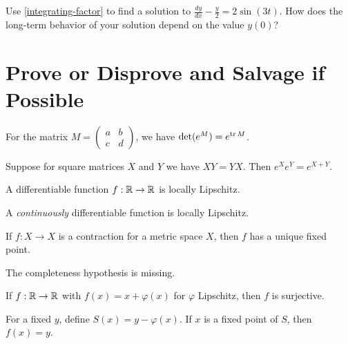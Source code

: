 \documentclass{homework}
\begin{document}
\begin{problem}Use \ref{integrating-factor} to find a solution to
  \(
    \displaystyle\frac{dy}{dx} - \displaystyle\frac{y}{2} = 2 \sin (3t).
  \)
  How does the long-term behavior of your solution depend on the value $y(0)$?
\end{problem}


\section{Prove or Disprove and Salvage if Possible}

\begin{problem}\label{two-by-two-jacobi-identity}For the matrix $M = \begin{pmatrix} a & b \\ c & d \end{pmatrix}$, we have
    $\det (e^M) = e^{\operatorname{tr} M}$.
\end{problem}

\begin{problem}\label{exp-commuting-matrices}Suppose for square matrices $X$ and $Y$ we have $XY = YX$.  Then $e^X e^Y = e^{X+Y}$.
\end{problem}

\begin{problem}
  A differentiable function $f : \mathbb{R} \to \mathbb{R}$ is locally Lipschitz.
\end{problem}

\begin{solution}
  A \textit{continuously} differentiable function is locally Lipschitz.
\end{solution}

\begin{problem}
  If $f : X \to X$ is a contraction for a metric space $X$, then
  $f$ has a unique fixed point.
\end{problem}

\begin{solution}
  The completeness hypothesis is missing.
\end{solution}

\begin{problem}
  If $f : \mathbb{R} \to \mathbb{R}$ with $f(x) = x + \varphi(x)$ for $\varphi$ Lipschitz, then $f$ is surjective.
\end{problem}

\begin{solution}
  For a fixed $y$, define $S(x) = y - \varphi(x)$.  If $x$ is a fixed point of $S$, then $f(x) = y$.
\end{solution}
\end{document}
